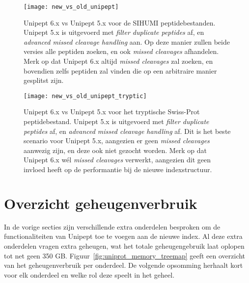 \begin{figure}[h]
    \centering
    \texttt{[image: new\_vs\_old\_unipept]}
    \caption{Unipept 6.x vs Unipept 5.x voor de SIHUMI peptidebestanden. Unipept 5.x is uitgevoerd met \textit{filter duplicate peptides} af, en \textit{advanced missed cleavage handling} aan. Op deze manier zullen beide versies alle peptiden zoeken, en ook \textit{missed cleavages} afhandelen. Merk op dat Unipept 6.x altijd \textit{missed cleavages} zal zoeken, en bovendien zelfs peptiden zal vinden die op een arbitraire manier gesplitst zijn.}
    \label{fig:new_vs_old_unipept}
\end{figure}

\begin{figure}[h]
    \centering
    \texttt{[image: new\_vs\_old\_unipept\_tryptic]}
    \caption{Unipept 6.x vs Unipept 5.x voor het tryptische Swiss-Prot peptidebestand. Unipept 5.x is uitgevoerd met \textit{filter duplicate peptides} af, en \textit{advanced missed cleavage handling} af. Dit is het beste scenario voor Unipept 5.x, aangezien er geen \textit{missed cleavages} aanwezig zijn, en deze ook niet gezocht worden. Merk op dat Unipept 6.x wél \textit{missed cleavages} verwerkt, aangezien dit geen invloed heeft op de performantie bij de nieuwe indexstructuur.}
    \label{fig:new_vs_old_unipept_tryptic}
\end{figure}
\newpage
\section{Overzicht geheugenverbruik}
In de vorige secties zijn verschillende extra onderdelen besproken om de functionaliteiten van Unipept toe te voegen aan de nieuwe index.
Al deze extra onderdelen vragen extra geheugen, wat het totale geheugengebruik laat oplopen tot net geen 350 GB\@.
Figuur~\ref{fig:uniprot_memory_treemap} geeft een overzicht van het geheugenverbruik per onderdeel.
De volgende opsomming herhaalt kort voor elk onderdeel en welke rol deze speelt in het geheel.

